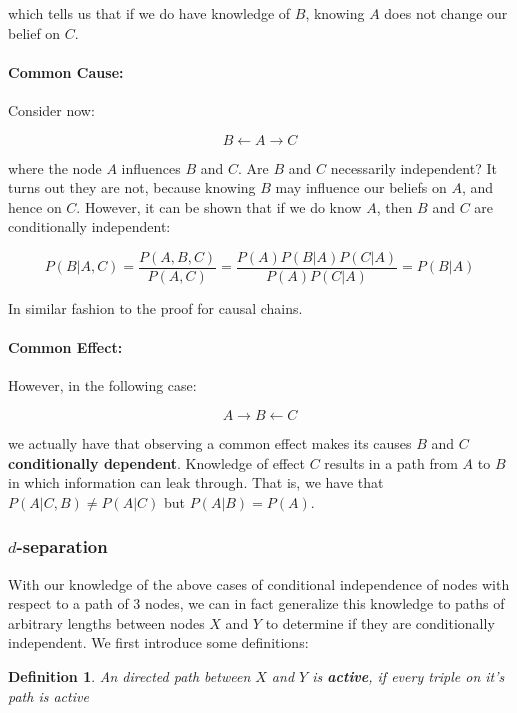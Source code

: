 \documentclass[12pt]{article}
\newtheorem{definition}{Definition}
\begin{document}
which tells us that if we do have knowledge of $B$, knowing $A$ does not change our belief on $C$.

\paragraph{Common Cause:} Consider now:

\begin{equation*}
B \leftarrow A \rightarrow C
\end{equation*}

where the node $A$ influences $B$ and $C$. Are $B$ and $C$ necessarily independent? It turns out they are not, because knowing $B$ may influence our beliefs on $A$, and hence on $C$. However, it can be shown that if we do know $A$, then $B$ and $C$ are conditionally independent:

\begin{equation*}
P(B|A,C) = \frac{P(A,B,C)}{P(A,C)} = \frac{P(A)P(B|A)P(C|A)}{P(A)P(C|A)} = P(B|A)
\end{equation*}

In similar fashion to the proof for causal chains.

\paragraph{Common Effect:} However, in the following case:

\begin{equation*}
A \rightarrow B \leftarrow C
\end{equation*}

we actually have that observing a common effect makes its causes $B$ and $C$ \textbf{conditionally dependent}. Knowledge of effect $C$ results in a path from $A$ to $B$ in which information can leak through. That is, we have that $P(A|C,B) \neq P(A|C)$ but $P(A|B) = P(A)$.

\subsubsection{$d$-separation}

With our knowledge of the above cases of conditional independence of nodes with respect to a path of 3 nodes, we can in fact generalize this knowledge to paths of arbitrary lengths between nodes $X$ and $Y$ to determine if they are conditionally independent. We first introduce some definitions:

\begin{definition}
An directed path between $X$ and $Y$ is \textbf{active}, if every triple on it's path is active
\end{definition}
\end{document}
